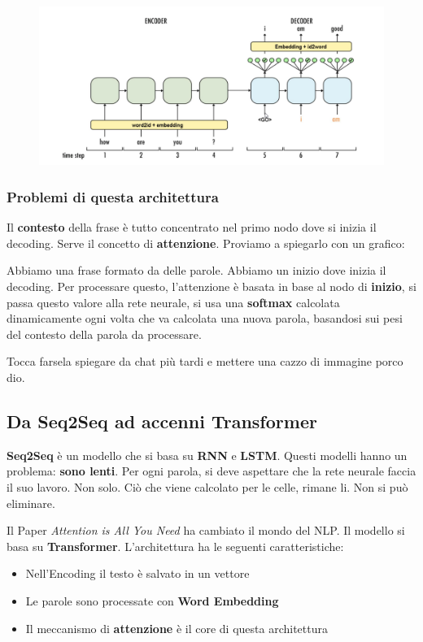 \begin{figure}[H]
    \begin{center}
        \includegraphics[width=0.8\linewidth]{images/seq2seq.png}
    \end{center}
\end{figure}


\subsubsection{Problemi di questa architettura}

Il \textbf{contesto} della frase è tutto concentrato nel primo nodo dove si inizia il decoding. Serve il concetto di \textbf{attenzione}.
Proviamo a spiegarlo con un grafico:


Abbiamo una frase formato da delle parole. Abbiamo un inizio dove inizia il decoding. Per processare questo, l'attenzione è basata in base al nodo di \textbf{inizio}, si passa questo valore 
alla rete neurale, si usa una \textbf{softmax} calcolata dinamicamente ogni volta che va calcolata una nuova parola, basandosi sui pesi del contesto della parola da processare.


Tocca farsela spiegare da chat più tardi e mettere una cazzo di immagine porco dio.


\subsection{Da Seq2Seq ad accenni Transformer}

\textbf{Seq2Seq} è un modello che si basa su \textbf{RNN} e \textbf{LSTM}. Questi modelli hanno un problema: \textbf{sono lenti}. Per ogni parola, si deve aspettare che la rete neurale
faccia il suo lavoro. Non solo. Ciò che viene calcolato per le celle, rimane li. Non si può eliminare.

Il Paper \textit{Attention is All You Need} ha cambiato il mondo del NLP. Il modello si basa su \textbf{Transformer}. L'architettura ha le seguenti caratteristiche:
\begin{itemize}
    \item Nell'Encoding il testo è salvato in un vettore 
    \item Le parole sono processate con \textbf{Word Embedding}
    \item Il meccanismo di \textbf{attenzione} è il core di questa architettura
\end{itemize}

